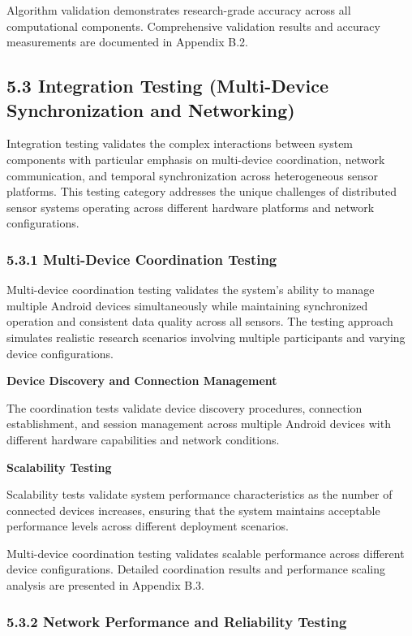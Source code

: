 \documentclass[12pt,a4paper]{article}
\begin{document}
Algorithm validation demonstrates research-grade accuracy across all computational components. Comprehensive validation
results and accuracy measurements are documented in Appendix B.2.

\subsection{5.3 Integration Testing (Multi-Device Synchronization and Networking)}

Integration testing validates the complex interactions between system components with particular emphasis on
multi-device coordination, network communication, and temporal synchronization across heterogeneous sensor platforms.
This testing category addresses the unique challenges of distributed sensor systems operating across different hardware
platforms and network configurations.

\subsubsection{5.3.1 Multi-Device Coordination Testing}

Multi-device coordination testing validates the system's ability to manage multiple Android devices simultaneously while
maintaining synchronized operation and consistent data quality across all sensors. The testing approach simulates
realistic research scenarios involving multiple participants and varying device configurations.

\textbf{Device Discovery and Connection Management}

The coordination tests validate device discovery procedures, connection establishment, and session management across
multiple Android devices with different hardware capabilities and network conditions.

\textbf{Scalability Testing}

Scalability tests validate system performance characteristics as the number of connected devices increases, ensuring
that the system maintains acceptable performance levels across different deployment scenarios.

Multi-device coordination testing validates scalable performance across different device configurations. Detailed
coordination results and performance scaling analysis are presented in Appendix B.3.

\subsubsection{5.3.2 Network Performance and Reliability Testing}
\end{document}
